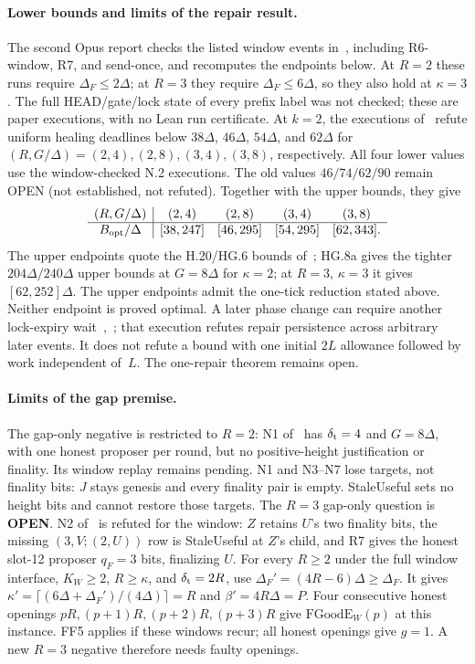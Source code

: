 \documentclass{article}
\theoremstyle{plain}
\theoremstyle{definition}
\theoremstyle{remark}
\newcommand{\OPEN}{\textbf{OPEN}}
\begin{document}
\paragraph{Lower bounds and limits of the repair result.}
The second Opus report checks the listed window events in~\cite[\S10]{BPH},
including R6-window, R7, and send-once, and recomputes the endpoints below.
At $R=2$ these runs require $\Delta_F\leq2\Delta$; at $R=3$ they
require $\Delta_F\leq6\Delta$, so they also hold at $\kappa=3$.
The full HEAD/gate/lock state of every prefix label was not checked;
these are paper executions, with no Lean run certificate.
At $k=2$, the executions of~\cite[N.2]{BPH} refute uniform healing
deadlines below $38\Delta$, $46\Delta$, $54\Delta$, and $62\Delta$
for $(R,G/\Delta)=(2,4),(2,8),(3,4),(3,8)$, respectively.
All four lower values use the window-checked N.2 executions.
The old values $46/74/62/90$ remain OPEN (not established, not refuted).
Together with the upper bounds, they give
\[
\begin{array}{c|cccc}
 (R,G/\Delta)&(2,4)&(2,8)&(3,4)&(3,8)\\ \hline
 B_{\rm opt}/\Delta&[38,247]&[46,295]&[54,295]&[62,343].
\end{array}
\]
The upper endpoints quote the H.20/HG.6 bounds of~\cite{BPH};
HG.8a gives the tighter $204\Delta/240\Delta$ upper bounds at $G=8\Delta$
for $\kappa=2$; at $R=3$, $\kappa=3$ it gives $[62,252]\Delta$.
The upper endpoints admit the one-tick reduction stated above.
Neither endpoint is proved optimal.  A later phase change can require
another lock-expiry wait~\cite[N.3]{BPH},~\cite{OR180,BBR}; that
execution refutes repair persistence across arbitrary later events.
It does not refute a bound with one initial $2L$ allowance followed
by work independent of~$L$.  The one-repair theorem remains open.

\paragraph{Limits of the gap premise.}
The gap-only negative is restricted to $R=2$: N1 of~\cite{BPF} has
$\delta_{\rm t}=4$ and $G=8\Delta$, with one honest proposer per
round, but no positive-height justification or finality. Its window replay
remains pending. N1 and N3--N7 lose targets, not finality bits: $J$ stays
genesis and every finality pair is empty. StaleUseful sets no height bits
and cannot restore those targets.
The $R=3$ gap-only question is \OPEN{}. N2 of~\cite{BPF} is refuted
for the window: $Z$ retains $U$'s two finality bits, the missing
$(3,V;(2,U))$ row is StaleUseful at $Z$'s child, and R7 gives the honest
slot-12 proposer $q_F=3$ bits, finalizing $U$.
For every $R\geq2$ under the full window interface, $K_W\geq2$,
$R\geq\kappa$, and $\delta_{\rm t}=2R$, use
$\Delta_F\prime=(4R-6)\Delta\geq\Delta_F$. It gives
$\kappa\prime=\lceil(6\Delta+\Delta_F\prime)/(4\Delta)\rceil=R$
and $\beta\prime=4R\Delta=P$. Four consecutive honest openings
$pR,(p+1)R,(p+2)R,(p+3)R$ give $\mathrm{FGoodE}_W(p)$ at this
instance. FF5 applies if these windows recur; all honest openings give
$g=1$. A new $R=3$ negative therefore needs faulty openings.
\end{document}
